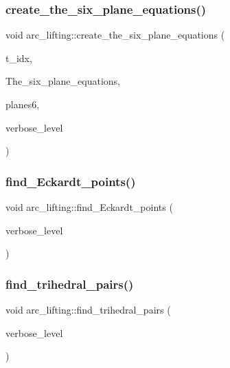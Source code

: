 \subsubsection{\texorpdfstring{create\+\_\+the\+\_\+six\+\_\+plane\+\_\+equations()}{create\_the\_six\_plane\_equations()}}
{\footnotesize\ttfamily void arc\+\_\+lifting\+::create\+\_\+the\+\_\+six\+\_\+plane\+\_\+equations (\begin{DoxyParamCaption}\item[{\mbox{\hyperlink{galois_8h_a09fddde158a3a20bd2dcadb609de11dc}{I\+NT}}}]{t\+\_\+idx,  }\item[{\mbox{\hyperlink{galois_8h_a09fddde158a3a20bd2dcadb609de11dc}{I\+NT}} $\ast$}]{The\+\_\+six\+\_\+plane\+\_\+equations,  }\item[{\mbox{\hyperlink{galois_8h_a09fddde158a3a20bd2dcadb609de11dc}{I\+NT}} $\ast$}]{planes6,  }\item[{\mbox{\hyperlink{galois_8h_a09fddde158a3a20bd2dcadb609de11dc}{I\+NT}}}]{verbose\+\_\+level }\end{DoxyParamCaption})}

\mbox{\label{classarc__lifting_a70012c92bd78768f5c1c5d14f995147b}} 
\subsubsection{\texorpdfstring{find\+\_\+\+Eckardt\+\_\+points()}{find\_Eckardt\_points()}}
{\footnotesize\ttfamily void arc\+\_\+lifting\+::find\+\_\+\+Eckardt\+\_\+points (\begin{DoxyParamCaption}\item[{\mbox{\hyperlink{galois_8h_a09fddde158a3a20bd2dcadb609de11dc}{I\+NT}}}]{verbose\+\_\+level }\end{DoxyParamCaption})}

\mbox{\label{classarc__lifting_a04b276087c97becd9a4e208ea7ec45fe}} 
\subsubsection{\texorpdfstring{find\+\_\+trihedral\+\_\+pairs()}{find\_trihedral\_pairs()}}
{\footnotesize\ttfamily void arc\+\_\+lifting\+::find\+\_\+trihedral\+\_\+pairs (\begin{DoxyParamCaption}\item[{\mbox{\hyperlink{galois_8h_a09fddde158a3a20bd2dcadb609de11dc}{I\+NT}}}]{verbose\+\_\+level }\end{DoxyParamCaption})}

